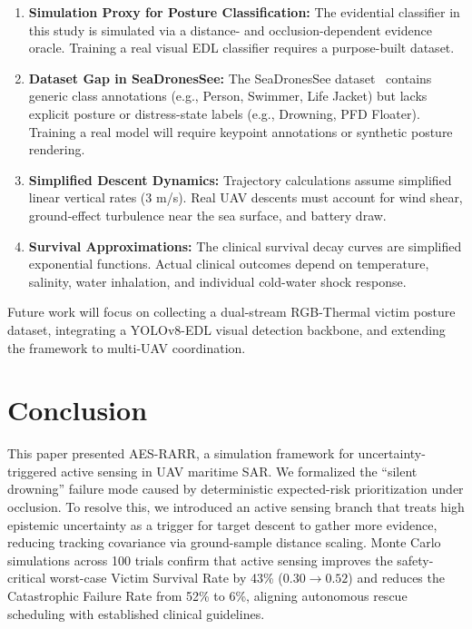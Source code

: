 \documentclass[11pt,a4paper]{article}
\begin{document}
\begin{enumerate}
  \item \textbf{Simulation Proxy for Posture Classification:} The evidential classifier in this study is simulated via a distance- and occlusion-dependent evidence oracle. Training a real visual EDL classifier requires a purpose-built dataset.
  \item \textbf{Dataset Gap in SeaDronesSee:} The SeaDronesSee dataset~\cite{ref3} contains generic class annotations (e.g., Person, Swimmer, Life Jacket) but lacks explicit posture or distress-state labels (e.g., Drowning, PFD Floater). Training a real model will require keypoint annotations or synthetic posture rendering.
  \item \textbf{Simplified Descent Dynamics:} Trajectory calculations assume simplified linear vertical rates ($3$ m/s). Real UAV descents must account for wind shear, ground-effect turbulence near the sea surface, and battery draw.
  \item \textbf{Survival Approximations:} The clinical survival decay curves are simplified exponential functions. Actual clinical outcomes depend on temperature, salinity, water inhalation, and individual cold-water shock response.
\end{enumerate}

Future work will focus on collecting a dual-stream RGB-Thermal victim posture dataset, integrating a YOLOv8-EDL visual detection backbone, and extending the framework to multi-UAV coordination.

\section{Conclusion}

This paper presented AES-RARR, a simulation framework for uncertainty-triggered active sensing in UAV maritime SAR.
We formalized the ``silent drowning'' failure mode caused by deterministic expected-risk prioritization under occlusion.
To resolve this, we introduced an active sensing branch that treats high epistemic uncertainty as a trigger for target descent to gather more evidence, reducing tracking covariance via ground-sample distance scaling.
Monte Carlo simulations across 100 trials confirm that active sensing improves the safety-critical worst-case Victim Survival Rate by 43\% ($0.30 \to 0.52$) and reduces the Catastrophic Failure Rate from 52\% to 6\%, aligning autonomous rescue scheduling with established clinical guidelines.
\end{document}
